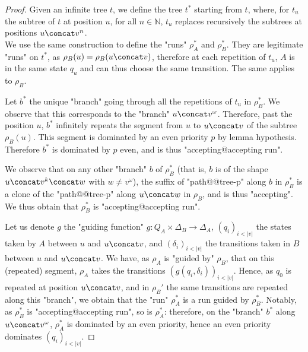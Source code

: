\documentclass[a4paper,UKenglish,cleveref, autoref, thm-restate]{lipics-v2021}
\newcommand{\NN}{\mathbb{N}}
\begin{document}
\begin{proof}
Given an infinite tree $t$, we define the tree $t^*$ starting from $t$, where, for $t_u$ the subtree of $t$ at position $u$, for all $n \in \NN$, $t_u$ replaces recursively the subtrees at positions $u \concat v^n$.\\
We use the same construction to define the "runs" $\rho_A^*$ and $\rho_B^*$. They are legitimate "runs" on $t^*$, as $\rho_B(u) = \rho_B(u\concat v)$, therefore at each repetition of $t_u$, $A$ is in the same state $q_u$ and can thus choose the same transition. The same applies to $\rho_B$.

Let $b^*$ the unique "branch" going through all the repetitions of $t_u$ in $\rho_B^*$. We observe  that this corresponds to the "branch" $u \concat v^\omega$. Therefore, past the position $u$, $b^*$ infinitely repeats the segment from $u$ to $u\concat v$ of the subtree $\rho_B(u)$. This segment is dominated by an even priority $p$ by lemma hypothesis. Therefore $b^*$ is dominated by $p$ even, and is thus "accepting@accepting run".

We observe that on  any other "branch" $b$ of $\rho_B^*$ (that is, $b$ is of the shape $u\concat v^k \concat w$ with $w \neq v^\omega$), the suffix of "path@@tree-p" along $b$ in $\rho_B^*$ is a clone of the "path@@tree-p" along $u\concat w$ in $\rho_B$, and is thus "accepting". We thus obtain that $\rho_B^*$ is "accepting@accepting run".

Let us denote $g$ the "guiding function" $g : Q_A \times \Delta_B \to \Delta_A$, $(q_i)_{i < |v|}$ the states taken by $A$ between $u$ and $u \concat v$, and $(\delta_i)_{i < |v|}$ the transitions taken in $B$ between $u$ and $u \concat v$. We have, as $\rho_A$ is "guided by" $\rho_B$, that on this (repeated) segment, $\rho_A$ takes the transitions $(g(q_i, \delta_i))_{i< |v|}$.
Hence, as $q_0$ is repeated at position $u\concat v$, and in $\rho_B'$ the same transitions are repeated along this "branch", we obtain that the "run" $\rho_A^*$ is a run guided by $\rho_B^*$. Notably, as $\rho_B^*$ is "accepting@accepting run", so is $\rho_A^*$: therefore, on the "branch" $b^*$ along $u \concat v^\omega$, $\rho_A^*$ is dominated by an even priority, hence an even priority dominates $(q_i)_{i<|v|}$.
\end{proof}

\guidableNBound*
\end{document}

